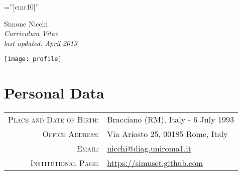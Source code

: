 \documentclass[a4paper,10pt]{article} %
\begin{document}
\pagestyle{empty} %

\font\fb=''[cmr10]'' %



\noindent\begin{minipage}{0.6\textwidth}\raggedright%
\hspace{5em} \Huge{Simone Nicchi} \\
\vspace{0.6em}
\hspace{2.4em} \LARGE{\textit{Curriculum Vitae}} \\
\vspace{1.2em}
\hspace{3.3em} \large{\textit{last updated: April 2019}}
\end{minipage}%
\hfill%
\begin{minipage}{0.3\textwidth}
\texttt{[image: profile]}
\end{minipage}


\section{Personal Data}

\begin{tabular}{rl}
\textsc{Place and Date of Birth:} & Bracciano (RM), Italy - 6 July 1993 \\
\textsc{Office Address:} & Via Ariosto 25, 00185 Rome, Italy \\
\textsc{Email:} & \href{mailto:nicchi@diag.uniroma1.it}{nicchi@diag.uniroma1.it}\\
\textsc{Institutional Page:} & \href{https://simuset.github.com}{https://simuset.github.com}
\end{tabular}

\end{document}
